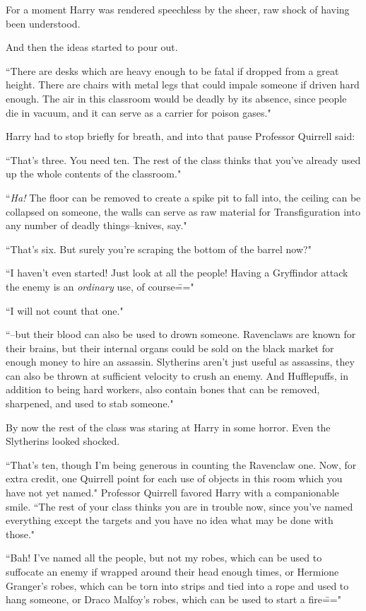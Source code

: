For a moment Harry was rendered speechless by the sheer, raw shock of having been understood.

And then the ideas started to pour out.

``There are desks which are heavy enough to be fatal if dropped from a great height. There are chairs with metal legs that could impale someone if driven hard enough. The air in this classroom would be deadly by its absence, since people die in vacuum, and it can serve as a carrier for poison gases."

Harry had to stop briefly for breath, and into that pause Professor Quirrell said:

``That's three. You need ten. The rest of the class thinks that you've already used up the whole contents of the classroom."

``\emph{Ha!} The floor can be removed to create a spike pit to fall into, the ceiling can be collapsed on someone, the walls can serve as raw material for Transfiguration into any number of deadly things\---knives, say."

``That's six. But surely you're scraping the bottom of the barrel now?"

``I haven't even started! Just look at all the people! Having a Gryffindor attack the enemy is an \emph{ordinary} use, of course\==="

``I will not count that one."

``\---but their blood can also be used to drown someone. Ravenclaws are known for their brains, but their internal organs could be sold on the black market for enough money to hire an assassin. Slytherins aren't just useful as assassins, they can also be thrown at sufficient velocity to crush an enemy. And Hufflepuffs, in addition to being hard workers, also contain bones that can be removed, sharpened, and used to stab someone."

By now the rest of the class was staring at Harry in some horror. Even the Slytherins looked shocked.

``That's ten, though I'm being generous in counting the Ravenclaw one. Now, for extra credit, one Quirrell point for each use of objects in this room which you have not yet named." Professor Quirrell favored Harry with a companionable smile. ``The rest of your class thinks you are in trouble now, since you've named everything except the targets and you have no idea what may be done with those."

``Bah! I've named all the people, but not my robes, which can be used to suffocate an enemy if wrapped around their head enough times, or Hermione Granger's robes, which can be torn into strips and tied into a rope and used to hang someone, or Draco Malfoy's robes, which can be used to start a fire\==="

